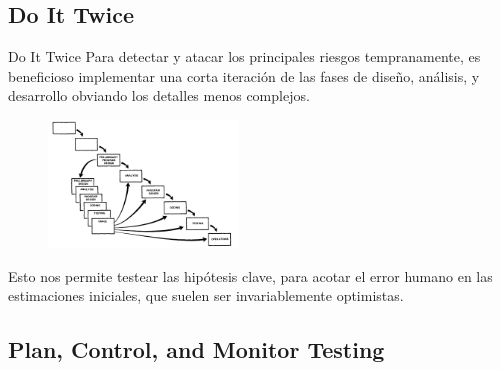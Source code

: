 \documentclass{beamer}
\begin{document}
\subsection{Do It Twice}
\begin{frame}{Do It Twice}
Para detectar y atacar los principales riesgos tempranamente, es beneficioso implementar una corta iteración de las fases de diseño, análisis, y desarrollo obviando los detalles menos complejos.

\begin{figure}
\includegraphics[width=0.45\textwidth]{figures/hazloDosVeces.png}
\end{figure}

Esto nos permite testear las hipótesis clave, para acotar el error humano en las estimaciones iniciales, que suelen ser invariablemente optimistas.



\end{frame}

\subsection{Plan, Control, and Monitor Testing}
\end{document}

